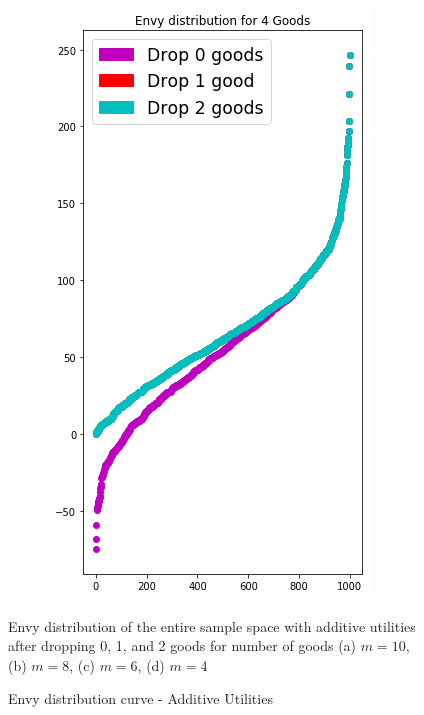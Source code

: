 \begin{figure}[h!]
\begin{subfigure}[b]{0.47\linewidth}
    \includegraphics[width=\linewidth]{images/envy_density/envy_density_u4.png}
    \caption{}
  \end{subfigure}
  \caption{Envy distribution curve - Additive Utilities}
  \label{fig_efk_dist_curve_add}
  \small
    Envy distribution of the entire sample space with additive utilities after dropping 0, 1, and 2 goods for number of goods (a) $m = 10$, (b) $m = 8$, (c) $m = 6$, (d) $m = 4$
\end{figure}

